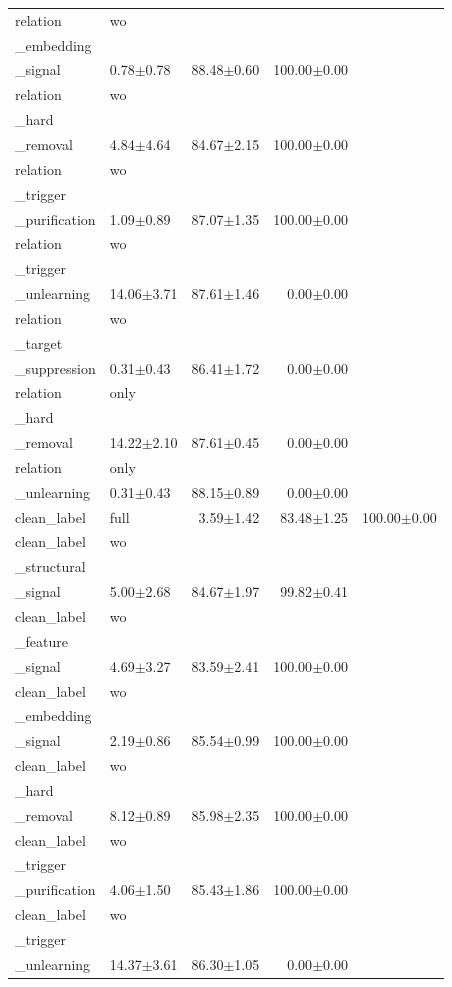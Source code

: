 \begin{table}[t]
\begin{tabular}{llrrr}
relation & wo\\_embedding\\_signal & 0.78$\pm$0.78 & 88.48$\pm$0.60 & 100.00$\pm$0.00 \\
relation & wo\\_hard\\_removal & 4.84$\pm$4.64 & 84.67$\pm$2.15 & 100.00$\pm$0.00 \\
relation & wo\\_trigger\\_purification & 1.09$\pm$0.89 & 87.07$\pm$1.35 & 100.00$\pm$0.00 \\
relation & wo\\_trigger\\_unlearning & 14.06$\pm$3.71 & 87.61$\pm$1.46 & 0.00$\pm$0.00 \\
relation & wo\\_target\\_suppression & 0.31$\pm$0.43 & 86.41$\pm$1.72 & 0.00$\pm$0.00 \\
relation & only\\_hard\\_removal & 14.22$\pm$2.10 & 87.61$\pm$0.45 & 0.00$\pm$0.00 \\
relation & only\\_unlearning & 0.31$\pm$0.43 & 88.15$\pm$0.89 & 0.00$\pm$0.00 \\
clean_label & full & 3.59$\pm$1.42 & 83.48$\pm$1.25 & 100.00$\pm$0.00 \\
clean_label & wo\\_structural\\_signal & 5.00$\pm$2.68 & 84.67$\pm$1.97 & 99.82$\pm$0.41 \\
clean_label & wo\\_feature\\_signal & 4.69$\pm$3.27 & 83.59$\pm$2.41 & 100.00$\pm$0.00 \\
clean_label & wo\\_embedding\\_signal & 2.19$\pm$0.86 & 85.54$\pm$0.99 & 100.00$\pm$0.00 \\
clean_label & wo\\_hard\\_removal & 8.12$\pm$0.89 & 85.98$\pm$2.35 & 100.00$\pm$0.00 \\
clean_label & wo\\_trigger\\_purification & 4.06$\pm$1.50 & 85.43$\pm$1.86 & 100.00$\pm$0.00 \\
clean_label & wo\\_trigger\\_unlearning & 14.37$\pm$3.61 & 86.30$\pm$1.05 & 0.00$\pm$0.00 \\

\end{tabular}
\end{table}
